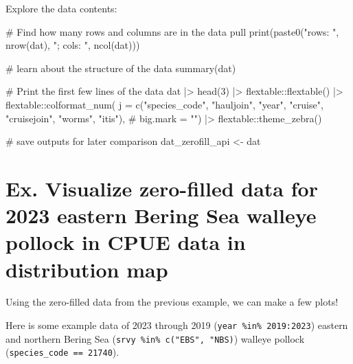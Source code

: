 \documentclass[
  letterpaper,
  oneside,
  open=any]{scrbook}
\newenvironment{Shaded}{\begin{snugshade}}{\end{snugshade}}
\newcommand{\AttributeTok}[1]{\textcolor[rgb]{0.40,0.45,0.13}{#1}}
\newcommand{\CommentTok}[1]{\textcolor[rgb]{0.37,0.37,0.37}{#1}}
\newcommand{\DecValTok}[1]{\textcolor[rgb]{0.68,0.00,0.00}{#1}}
\newcommand{\FunctionTok}[1]{\textcolor[rgb]{0.28,0.35,0.67}{#1}}
\newcommand{\NormalTok}[1]{\textcolor[rgb]{0.00,0.23,0.31}{#1}}
\newcommand{\OtherTok}[1]{\textcolor[rgb]{0.00,0.23,0.31}{#1}}
\newcommand{\SpecialCharTok}[1]{\textcolor[rgb]{0.37,0.37,0.37}{#1}}
\newcommand{\StringTok}[1]{\textcolor[rgb]{0.13,0.47,0.30}{#1}}
\begin{document}
Explore the data contents:

\begin{Shaded}
\begin{Highlighting}[]
\CommentTok{\# Find how many rows and columns are in the data pull}
\FunctionTok{print}\NormalTok{(}\FunctionTok{paste0}\NormalTok{(}\StringTok{"rows: "}\NormalTok{, }\FunctionTok{nrow}\NormalTok{(dat), }\StringTok{"; cols: "}\NormalTok{, }\FunctionTok{ncol}\NormalTok{(dat)))}

\CommentTok{\# learn about the structure of the data}
\FunctionTok{summary}\NormalTok{(dat)}

\CommentTok{\# Print the first few lines of the data }
\NormalTok{dat }\SpecialCharTok{|\textgreater{}} 
  \FunctionTok{head}\NormalTok{(}\DecValTok{3}\NormalTok{) }\SpecialCharTok{|\textgreater{}} 
\NormalTok{  flextable}\SpecialCharTok{::}\FunctionTok{flextable}\NormalTok{() }\SpecialCharTok{|\textgreater{}}
\NormalTok{  flextable}\SpecialCharTok{::}\FunctionTok{colformat\_num}\NormalTok{(}
      \AttributeTok{j =} \FunctionTok{c}\NormalTok{(}\StringTok{"species\_code"}\NormalTok{, }\StringTok{"hauljoin"}\NormalTok{, }\StringTok{"year"}\NormalTok{, }\StringTok{"cruise"}\NormalTok{, }\StringTok{"cruisejoin"}\NormalTok{, }\StringTok{"worms"}\NormalTok{, }\StringTok{"itis"}\NormalTok{), }\CommentTok{\#}
      \AttributeTok{big.mark =} \StringTok{""}\NormalTok{) }\SpecialCharTok{|\textgreater{}} 
\NormalTok{  flextable}\SpecialCharTok{::}\FunctionTok{theme\_zebra}\NormalTok{()}

\CommentTok{\# save outputs for later comparison}
\NormalTok{dat\_zerofill\_api }\OtherTok{\textless{}{-}}\NormalTok{ dat}
\end{Highlighting}
\end{Shaded}

\section{Ex. Visualize zero-filled data for 2023 eastern Bering Sea
walleye pollock in CPUE data in distribution
map}\label{ex.-visualize-zero-filled-data-for-2023-eastern-bering-sea-walleye-pollock-in-cpue-data-in-distribution-map}

Using the zero-filled data from the previous example, we can make a few
plots!

Here is some example data of 2023 through 2019
(\texttt{year\ \%in\%\ 2019:2023}) eastern and northern Bering Sea
(\texttt{srvy\ \%in\%\ c("EBS",\ "NBS)}) walleye pollock
(\texttt{species\_code\ ==\ 21740}).
\end{document}

